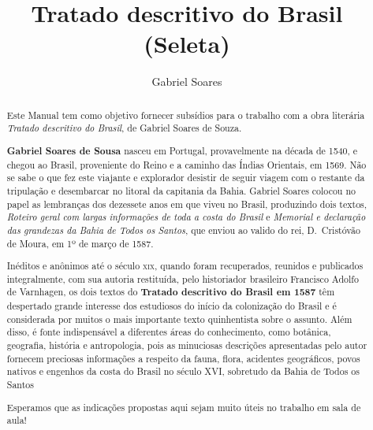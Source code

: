 \documentclass[12pt]{extarticle}
\begin{document}
\newcommand{\AutorLivro}{Gabriel Soares}
\newcommand{\TituloLivro}{Tratado descritivo do Brasil (Seleta)}
\newcommand{\Tema}{Diálogos com a sociologia e com a antropologia}
\newcommand{\Genero}{Diário, biografia, autobiografia, relatos, memórias}
\newcommand{\imagemCapa}{./images/PNLD0015-01.png}
\newcommand{\issnppub}{---}
\newcommand{\issnepub}{---}
\newcommand{\colaborador}{\textbf{Bruno Gradella e Vicente Castro} é uma pessoa incrível e vai fazer um bom serviço.}

{}
\title{\TituloLivro}
\author{\AutorLivro}
\def\authornotes{\colaborador}

\date{}
\maketitle

\baselineskip\par


\begin{abstract}
Este Manual tem como objetivo fornecer subsídios para o trabalho com a
obra literária \emph{Tratado descritivo do Brasil}, de Gabriel Soares
de Souza.

\textbf{Gabriel Soares de Sousa} nasceu em Portugal, provavelmente na
década de 1540, e chegou ao Brasil, proveniente do Reino e a caminho das
Índias Orientais, em 1569. Não se sabe o que fez este viajante e
explorador desistir de seguir viagem com o restante da tripulação e
desembarcar no litoral da capitania da Bahia. Gabriel Soares colocou no papel 
as lembranças dos dezessete anos em que viveu no Brasil, produzindo dois
textos, \textit{Roteiro geral com largas informações de toda a costa do
Brasil} e \textit{Memorial e declaração das grandezas da Bahia de Todos
os Santos}, que enviou ao valido do rei, D.~Cristóvão de Moura, em 1º
de março de 1587.

Inéditos e anônimos até o século \textsc{xix}, quando foram recuperados, 
reunidos e publicados integralmente, com sua autoria restituída, pelo 
historiador brasileiro Francisco Adolfo de Varnhagen, os dois textos do 
\textbf{Tratado descritivo do Brasil em 1587} têm despertado grande interesse 
dos estudiosos do início da colonização do Brasil e é considerada por muitos 
o mais importante texto quinhentista sobre o assunto. Além disso, é fonte 
indispensável a diferentes áreas do conhecimento, como botânica, geografia, 
história e antropologia, pois as minuciosas descrições apresentadas pelo autor 
fornecem preciosas informações a respeito da fauna, flora, acidentes geográficos, 
povos nativos e engenhos da costa do Brasil no século \textsc{XVI}, sobretudo da 
Bahia de Todos os Santos

Esperamos que as indicações propostas aqui sejam muito úteis no trabalho em
sala de aula!

\end{abstract}
\end{document}
